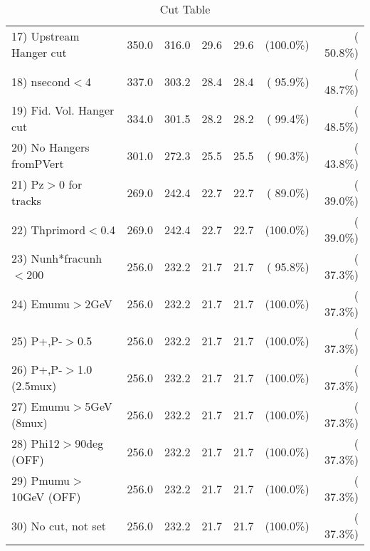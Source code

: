 \begin{table}[h!]
\begin{tabular}{||l||r|r|r|r|r|r||}
 17) Upstream Hanger cut  &        350.0 &        316.0 &         29.6 &         29.6 & (100.0\%) & ( 50.8\%) \\
 18) nsecond$<$4          &        337.0 &        303.2 &         28.4 &         28.4 & ( 95.9\%) & ( 48.7\%) \\
 19) Fid. Vol. Hanger cut &        334.0 &        301.5 &         28.2 &         28.2 & ( 99.4\%) & ( 48.5\%) \\
 20) No Hangers fromPVert &        301.0 &        272.3 &         25.5 &         25.5 & ( 90.3\%) & ( 43.8\%) \\
 21) Pz$>$0 for tracks    &        269.0 &        242.4 &         22.7 &         22.7 & ( 89.0\%) & ( 39.0\%) \\
 22) Thprimord$<$0.4      &        269.0 &        242.4 &         22.7 &         22.7 & (100.0\%) & ( 39.0\%) \\
 23) Nunh*fracunh$<$200   &        256.0 &        232.2 &         21.7 &         21.7 & ( 95.8\%) & ( 37.3\%) \\
 24) Emumu$>$2GeV         &        256.0 &        232.2 &         21.7 &         21.7 & (100.0\%) & ( 37.3\%) \\
 25) P+,P-$>$0.5          &        256.0 &        232.2 &         21.7 &         21.7 & (100.0\%) & ( 37.3\%) \\
 26) P+,P-$>$1.0 (2.5mux) &        256.0 &        232.2 &         21.7 &         21.7 & (100.0\%) & ( 37.3\%) \\
 27) Emumu$>$5GeV  (8mux) &        256.0 &        232.2 &         21.7 &         21.7 & (100.0\%) & ( 37.3\%) \\
 28) Phi12$>$90deg  (OFF) &        256.0 &        232.2 &         21.7 &         21.7 & (100.0\%) & ( 37.3\%) \\
 29) Pmumu$>$10GeV  (OFF) &        256.0 &        232.2 &         21.7 &         21.7 & (100.0\%) & ( 37.3\%) \\
 30) No cut, not set      &        256.0 &        232.2 &         21.7 &         21.7 & (100.0\%) & ( 37.3\%) \\
 \hline
 \hline
 \end{tabular}
 \caption{Cut Table           }
 \label{tab-cutcohjpsi-mumu_anumucc}
 \end{table}
